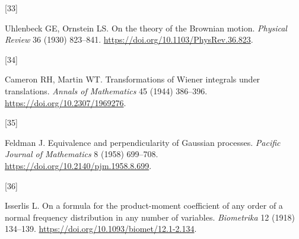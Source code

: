\documentclass[
  american,
  11pt,
]{article}
\newlength{\cslhangindent}
\newlength{\csllabelwidth}
\newenvironment{CSLReferences}[2] %
 {\begin{list}{}{%
  \setlength{\itemindent}{0pt}
  \setlength{\leftmargin}{0pt}
  \setlength{\parsep}{0pt}
  \ifodd #1
   \setlength{\leftmargin}{\cslhangindent}
   \setlength{\itemindent}{-1\cslhangindent}
  \fi
  \setlength{\itemsep}{#2\baselineskip}}}
 {\end{list}}
\newcommand{\CSLLeftMargin}[1]{\parbox[t]{\csllabelwidth}{\strut#1\strut}}
\newcommand{\CSLRightInline}[1]{\parbox[t]{\linewidth - \csllabelwidth}{\strut#1\strut}}
\begin{document}
\begin{CSLReferences}{0}{0}
\CSLLeftMargin{{[}33{]} }%
\CSLRightInline{Uhlenbeck GE, Ornstein LS. On the theory of the
{B}rownian motion. \emph{Physical Review} 36 (1930) 823--841.
\url{https://doi.org/10.1103/PhysRev.36.823}.}

\CSLLeftMargin{{[}34{]} }%
\CSLRightInline{Cameron RH, Martin WT. Transformations of {W}iener
integrals under translations. \emph{Annals of Mathematics} 45 (1944)
386--396. \url{https://doi.org/10.2307/1969276}.}

\CSLLeftMargin{{[}35{]} }%
\CSLRightInline{Feldman J. Equivalence and perpendicularity of
{G}aussian processes. \emph{Pacific Journal of Mathematics} 8 (1958)
699--708. \url{https://doi.org/10.2140/pjm.1958.8.699}.}

\CSLLeftMargin{{[}36{]} }%
\CSLRightInline{Isserlis L. On a formula for the product-moment
coefficient of any order of a normal frequency distribution in any
number of variables. \emph{Biometrika} 12 (1918) 134--139.
\url{https://doi.org/10.1093/biomet/12.1-2.134}.}

\end{CSLReferences}
\end{document}
